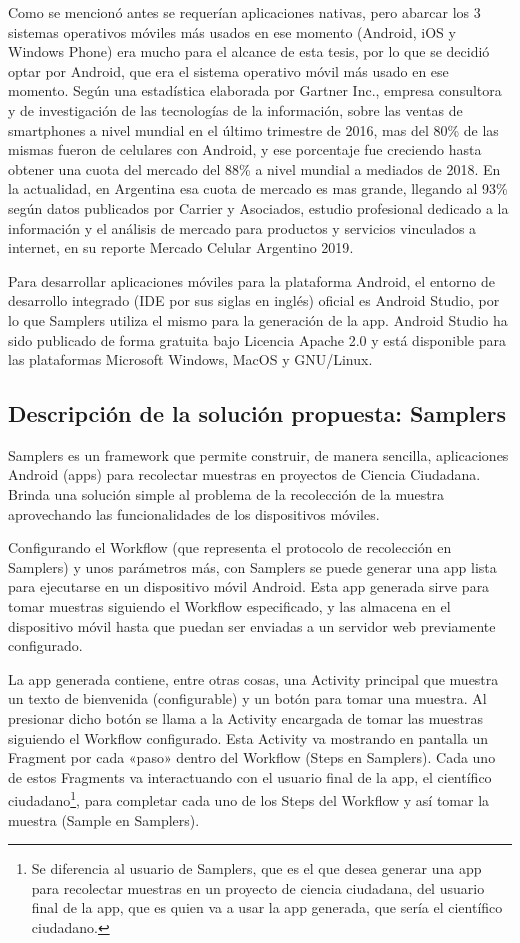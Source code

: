 Como se mencionó antes se requerían aplicaciones nativas, pero abarcar los 3 sistemas operativos móviles más usados en ese momento (Android, iOS y Windows Phone) era mucho para el alcance de esta tesis, por lo que se decidió optar por Android, que era el sistema operativo móvil más usado en ese momento. Según una estadística elaborada por Gartner Inc., empresa consultora y de investigación de las tecnologías de la información, sobre las ventas de smartphones a nivel mundial en el último trimestre de 2016\cite{gartner}, mas del 80\% de las mismas fueron de celulares con Android, y ese porcentaje fue creciendo hasta obtener una cuota del mercado del 88\% a nivel mundial a mediados de 2018. En la actualidad, en Argentina esa cuota de mercado es mas grande, llegando al 93\% según datos publicados por Carrier y Asociados, estudio profesional dedicado a la información y el análisis de mercado para productos y servicios vinculados a internet, en su reporte Mercado Celular Argentino 2019\cite{carrier}.

Para desarrollar aplicaciones móviles para la plataforma Android, el entorno de desarrollo integrado (IDE por sus siglas en inglés) oficial es Android Studio\cite{androidStudio}, por lo que Samplers utiliza el mismo para la generación de la app. Android Studio ha sido publicado de forma gratuita bajo Licencia Apache 2.0 y está disponible para las plataformas Microsoft Windows, MacOS y GNU/Linux.

\subsection{Descripción de la solución propuesta: Samplers}
Samplers es un framework que permite construir, de manera sencilla, aplicaciones Android (apps) para recolectar muestras en proyectos de Ciencia Ciudadana. Brinda una solución simple al problema de la recolección de la muestra aprovechando las funcionalidades de los dispositivos móviles.

Configurando el Workflow (que representa el protocolo de recolección en Samplers) y unos parámetros más, con Samplers se puede generar una app lista para ejecutarse en un dispositivo móvil Android. Esta app generada sirve para tomar muestras siguiendo el Workflow especificado, y las almacena en el dispositivo móvil hasta que puedan ser enviadas a un servidor web previamente configurado.

La app generada contiene, entre otras cosas, una Activity principal que muestra un texto de bienvenida (configurable) y un botón para tomar una muestra. Al presionar dicho botón se llama a la Activity encargada de tomar las muestras siguiendo el Workflow configurado. Esta Activity va mostrando en pantalla un Fragment por cada «paso» dentro del Workflow (Steps en Samplers). Cada uno de estos Fragments va interactuando con el usuario final de la app, el científico ciudadano\footnote{Se diferencia al usuario de Samplers, que es el que desea generar una app para recolectar muestras en un proyecto de ciencia ciudadana, del usuario final de la app, que es quien va a usar la app generada, que sería el científico ciudadano.}, para completar cada uno de los Steps del Workflow y así tomar la muestra (Sample en Samplers).

